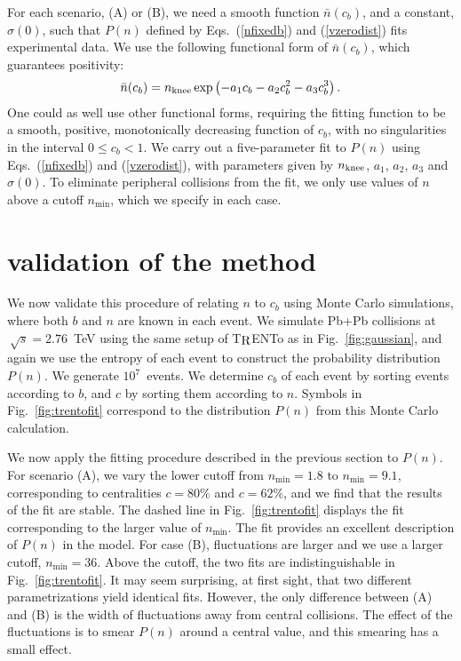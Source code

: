 \documentclass[aps,prc,twocolumn,superscriptaddress,showpacs,floatfix,nofootinbib]{revtex4-1}
\newcommand{\trento}{T$\mathrel{\protect\raisebox{-2.1pt}{R}}$ENTo}
\begin{document}
For each scenario, (A) or (B), we need a smooth function $\bar n(c_b)$, and a constant, $\sigma(0)$, such that $P(n)$ defined by Eqs.~(\ref{nfixedb}) and (\ref{vzerodist}) fits experimental data. 
We use the following functional form of $\bar n(c_b)$, which guarantees positivity:  
\begin{equation}
\label{fitfunction}
\bar n(c_b)=n_{\rm knee}\exp\left(-a_1 c_b-a_2 c_b^2-a_3 c_b^3\right).
\end{equation}
One could as well use other functional forms, requiring the fitting function to be a smooth, positive, monotonically decreasing function of $c_b$, with no singularities in the interval $0\le c_b<1$.
We carry out a five-parameter fit to $P(n)$ using Eqs.~(\ref{nfixedb}) and (\ref{vzerodist}), with parameters given by $n_{\rm knee}$, $a_1$, $a_2$, $a_3$ and $\sigma(0)$. 
To eliminate peripheral collisions from the fit, we only use values of $n$ above a cutoff  $n_{\min}$, which we specify in each case. 

\section{validation of the method}
\label{s:trento}

We now validate this procedure of relating $n$ to $c_b$ using Monte Carlo simulations, where both $b$ and $n$ are known in each event.
We simulate Pb+Pb collisions at $~\sqrt{s}=2.76$~TeV using the same setup of \trento{} as in Fig.~\ref{fig:gaussian}, and again we use the entropy of each event to construct the probability distribution $P(n)$.
We generate $10^7$~events. 
We determine $c_b$ of each event by sorting events according to $b$, and $c$ by sorting them according to $n$. 
Symbols in Fig.~\ref{fig:trentofit} correspond to the distribution $P(n)$ from this Monte Carlo calculation. 

We now apply the fitting procedure described in the previous section to $P(n)$. 
For scenario (A), we vary the lower cutoff from $n_{\min}=1.8$ to $n_{\min}=9.1$, corresponding to centralities $c=80\%$ and $c=62\%$, and we find that the results of the fit are stable. 
The dashed line in Fig.~\ref{fig:trentofit} displays the fit corresponding to the larger value of $n_{\min}$.
The fit provides an excellent description of $P(n)$ in the model.
For case (B), fluctuations are larger and we use a larger cutoff, $n_{\min}=36$.
Above the cutoff, the two fits are indistinguishable in Fig.~\ref{fig:trentofit}.
It may seem surprising, at first sight, that two different parametrizations yield identical fits.
However, the only difference between (A) and (B) is the width of fluctuations away from central collisions. 
The effect of the fluctuations is to smear $P(n)$ around a central value, and this smearing has a small effect. 
\end{document}
